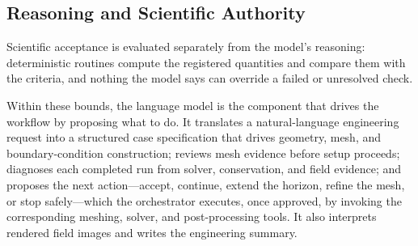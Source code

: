 \documentclass[11pt]{article}
\begin{document}
\subsection{Reasoning and Scientific Authority}
\label{sec:authority}

Scientific acceptance is evaluated separately from the model's reasoning:
deterministic routines compute the registered quantities and compare them
with the criteria, and nothing the model says can override a failed or
unresolved check.

Within these bounds, the language model is the component that drives the
workflow by proposing what to do. It translates a natural-language engineering request
into a structured case specification that drives geometry, mesh, and
boundary-condition construction; reviews mesh evidence before setup proceeds;
diagnoses each completed run from solver, conservation, and field evidence;
and proposes the next action---accept, continue, extend the horizon, refine the
mesh, or stop safely---which the orchestrator executes, once approved, by invoking the
corresponding meshing, solver, and post-processing tools. It also interprets
rendered field images and writes the engineering summary.
\end{document}
